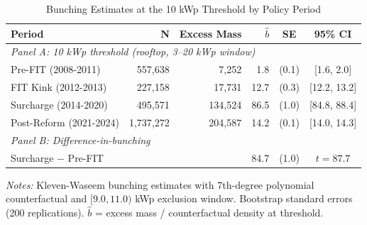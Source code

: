 \begin{table}[t]
\centering
\caption{Bunching Estimates at the 10 kWp Threshold by Policy Period}
\label{tab:bunching}
\begin{tabular}{lrrrcc}
\toprule
Period & N & Excess Mass & $\hat{b}$ & SE & 95\% CI \\
\midrule
\multicolumn{6}{l}{\textit{Panel A: 10 kWp threshold (rooftop, 3--20 kWp window)}} \\
Pre-FIT (2008-2011) &   557,638 &   7,252 & 1.8 & (0.1) & [1.6, 2.0] \\
FIT Kink (2012-2013) &   227,158 &  17,731 & 12.7 & (0.3) & [12.2, 13.2] \\
Surcharge (2014-2020) &   495,571 & 134,524 & 86.5 & (1.0) & [84.8, 88.4] \\
Post-Reform (2021-2024) & 1,737,272 & 204,587 & 14.2 & (0.1) & [14.0, 14.3] \\
\midrule
\multicolumn{6}{l}{\textit{Panel B: Difference-in-bunching}} \\
Surcharge $-$ Pre-FIT & & & 84.7 & (1.0) & $t = 87.7$ \\
\bottomrule
\end{tabular}

\vspace{0.5em}
\begin{flushleft}\small \textit{Notes:} Kleven-Waseem bunching estimates with 7th-degree polynomial counterfactual and $[9.0, 11.0)$ kWp exclusion window. Bootstrap standard errors (200 replications). $\hat{b}$ = excess mass / counterfactual density at threshold.\end{flushleft}
\end{table}
